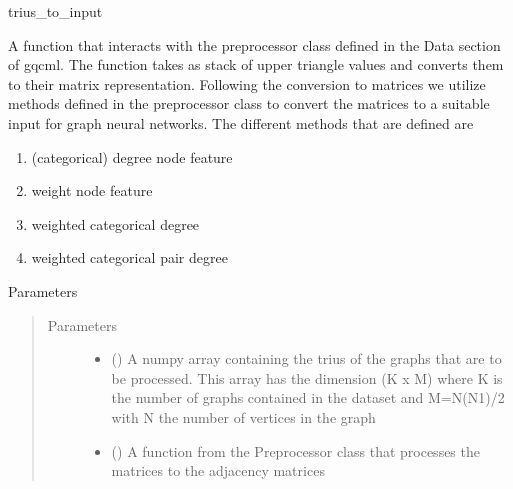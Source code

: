 \documentclass[letterpaper,10pt,english]{sphinxmanual}
\begin{document}
\begin{fulllineitems}
\label{\detokenize{modules/gqcml.datasets:gqcml.datasets.Datasets.trius_to_inputs}}
trius\_to\_input

A function that interacts with the preprocessor class defined in the Data section of gqcml.
The function takes as stack of upper triangle values and converts them to their matrix representation.
Following the conversion to matrices we utilize methods defined in the preprocessor class to
convert the matrices to a suitable input for graph neural networks. The different methods that are
defined are
\begin{enumerate}
%
\item {} 
(categorical) degree node feature

\item {} 
weight node feature

\item {} 
weighted categorical degree

\item {} 
weighted categorical pair degree

\end{enumerate}

Parameters
\begin{quote}\begin{description}
\item[{Parameters}] \leavevmode\begin{itemize}
\item {} 
\sphinxstyleliteralstrong{\sphinxupquote{(}}\sphinxstyleliteralstrong{\sphinxupquote{)}} () \textendash{} A numpy array containing the trius of the graphs that are to be processed. This
array has the dimension (K x M) where K is the number of graphs contained in the
dataset and M=N(N\sphinxhyphen{}1)/2 with N the number of vertices in the graph

\item {} 
\sphinxstyleliteralstrong{\sphinxupquote{(}}\sphinxstyleliteralstrong{\sphinxupquote{)}} () \textendash{} A function from the Preprocessor class that processes
the matrices to the adjacency matrices


\end{itemize}
\end{description}
\end{quote}
\end{fulllineitems}
\end{document}
